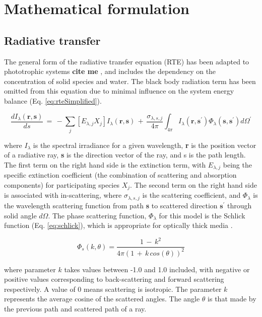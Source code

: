 
\newpage
\section{Mathematical formulation}
\label{S:formulation}
\subsection{Radiative transfer}
The general form of the radiative transfer equation (RTE) has been adapted to phototrophic systems \textbf{cite me} \cite{Kong2014}, and includes the dependency on the concentration of solid species and water. The black body radiation term has been omitted from this equation due to minimal influence on the system energy balance (Eq. \ref{eq:rteSimplified}). 

\begin{equation}
\frac{dI_\lambda (\textbf{r}, \textbf{s})}{ds} \, = \, - \sum_{j} [E_{\lambda,j} X_j] I_\lambda (\textbf{r}, \textbf{s})\, +\, \frac{\sigma_{\lambda, s, j}}{4 \pi} \int_{4 \pi} I_\lambda (\textbf{r}, \textbf{s}^\prime) \Phi_\lambda(\textbf{s}, \textbf{s}^\prime) d\Omega^\prime
    \end{equation}

where $I_\lambda$ is the spectral irradiance for a given wavelength, \textbf{r} is the position vector of a radiative ray, \textbf{s} is the direction vector of the ray, and s is the path length. The first term on the right hand side is the extinction term, with $E_{\lambda, j}$ being the specific extinction coefficient (the combination of scattering and absorption components) for participating species $X_j$. The second term on the right hand side is associated with in-scattering, where $\sigma_{\lambda, s, j}$ is the scattering coefficient, and $\Phi_\lambda$ is the wavelength scattering function from path \textbf{s} to scattered direction $\textbf{s}^\prime$ through solid angle $d\Omega$. The phase scattering function, $\Phi_\lambda$ for this model is the Schlick function (Eq. \ref{eq:schlick}), which is appropriate for optically thick media \cite{Jarosz2008}. 

\begin{equation}
\Phi_s(k, \theta) = \frac{1 \, -\,  k^2}{4\pi (1\, +\,k\, cos(\theta))^2 }
\end{equation}

where parameter $k$ takes values between -1.0 and 1.0 included, with negative or positive values corresponding to back-scattering and forward scattering respectively. A value of 0 means scattering is isotropic. The parameter $k$ represents the average cosine of the scattered angles. The angle $\theta$ is that made by the previous path and scattered path of a ray.

